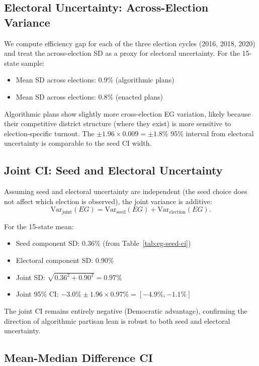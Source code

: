 \subsection{Electoral Uncertainty: Across-Election Variance}

We compute efficiency gap for each of the three election cycles
(2016, 2018, 2020) and treat the across-election SD as a proxy for
electoral uncertainty. For the 15-state sample:
\begin{itemize}
  \item Mean SD across elections: $0.9\%$ (algorithmic plans)
  \item Mean SD across elections: $0.8\%$ (enacted plans)
\end{itemize}

Algorithmic plans show slightly more cross-election EG variation,
likely because their competitive district structure (where they
exist) is more sensitive to election-specific turnout. The
$\pm 1.96 \times 0.009 = \pm 1.8\%$ 95\% interval from electoral
uncertainty is comparable to the seed CI width.

\subsection{Joint CI: Seed and Electoral Uncertainty}

Assuming seed and electoral uncertainty are independent (the seed
choice does not affect which election is observed), the joint variance
is additive:
\begin{equation}
  \text{Var}_\text{joint}(EG) = \text{Var}_\text{seed}(EG) +
  \text{Var}_\text{election}(EG).
\end{equation}

For the 15-state mean:
\begin{itemize}
  \item Seed component SD: $0.36\%$ (from Table~\ref{tab:eg-seed-ci})
  \item Electoral component SD: $0.90\%$
  \item Joint SD: $\sqrt{0.36^2 + 0.90^2} = 0.97\%$
  \item Joint 95\% CI: $-3.0\% \pm 1.96 \times 0.97\% = [-4.9\%, -1.1\%]$
\end{itemize}

The joint CI remains entirely negative (Democratic advantage), confirming
the direction of algorithmic partisan lean is robust to both seed and
electoral uncertainty.

\subsection{Mean-Median Difference CI}

